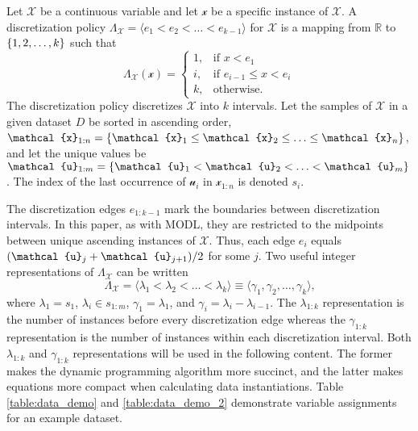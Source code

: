 \documentclass[twoside,11pt]{article}
\newcommand{\paren}[1]{\mathopen{}\mathclose\bgroup\left(#1\aftergroup\egroup\right)}
\newcommand{\curly}[1]{\mathopen{}\mathclose\bgroup\left\{#1\aftergroup\egroup\right\}}
\newcommand{\anglebrackets}[1]{\langle #1 \rangle}
\newcommand{\cX}{\mathcal{X}} %
\newcommand{\cx}{\mathcal{x}} %
\newcommand{\cu}{\mathcal{u}} %
\begin{document}
Let $\cX$ be a continuous variable and let $\cx$ be a specific instance of $\cX$.
A discretization policy $\Lambda_{\cX} = \anglebrackets{e_1 < e_2 < \ldots < e_{k-1}}$ for $\cX$ is a mapping from $\mathbb{R}$ to $\curly{1,2,\ldots,k}$ such that
\begin{equation}
  \Lambda_{\cX}(\cx) = \begin{cases}
    1, & \text{if $x<e_1$}\\
    i, & \text{if $e_{i-1} \leq x < e_i$}\\
    k, & \text{otherwise.}
  \end{cases}
\end{equation}
The discretization policy discretizes $\cX$ into $k$ intervals.
Let the samples of $\cX$ in a given dataset $D$ be sorted in ascending order, ${\cx_{1:n} = \curly{\cx_1 \leq \cx_2 \leq \ldots \leq \cx_n}}$, and let the unique values be ${\cu_{1:m} = \curly{\cu_1 < \cu_2 < \ldots < \cu_{m}}}$.
The index of the last occurrence of $\cu_i$ in $\cx_{1:n}$ is denoted $s_i$.

The discretization edges $e_{1:k-1}$ mark the boundaries between discretization intervals.
In this paper, as with MODL, they are restricted to the midpoints between unique ascending instances of $\cX$.
Thus, each edge $e_i$ equals $\paren{\cu_{j} + \cu_{{j+1}}}/2$ for some $j$.
Two useful integer representations of $\Lambda_{\cX}$ can be written
\begin{equation}
\label{eq:disc_def}
  \Lambda_{\cX} = \anglebrackets{\lambda_1 < \lambda_2  < \ldots < \lambda_k} \equiv \anglebrackets{\gamma_1, \gamma_2, \ldots, \gamma_k}\text{,}
\end{equation}
where $\lambda_1 = s_1$, $\lambda_i \in s_{1:m}$, $\gamma_1 = \lambda_1$, and $\gamma_i = \lambda_i - \lambda_{i-1}$.
The $\lambda_{1:k}$ representation is the number of instances before every discretization edge whereas the $\gamma_{1:k}$ representation is the number of instances within each discretization interval. Both $\lambda_{1:k}$ and $\gamma_{1:k}$ representations will be used in the following content. The former makes the dynamic programming algorithm more succinct, and the latter makes equations more compact when calculating data instantiations. Table \ref{table:data_demo} and \ref{table:data_demo_2} demonstrate variable assignments for an example dataset.
\end{document}

